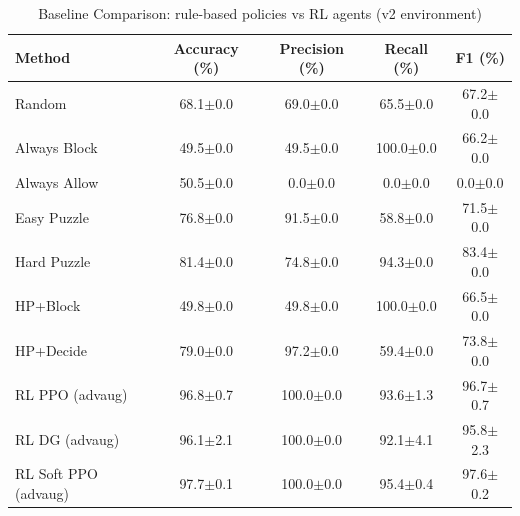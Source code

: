 \begin{table}[h]
\centering
\caption{Baseline Comparison: rule-based policies vs RL agents (v2 environment)}
\label{tab:baselines}
\begin{tabular}{lcccc}
\toprule
Method & Accuracy (\%) & Precision (\%) & Recall (\%) & F1 (\%) \\
\midrule
  Random & 68.1$\pm$0.0 & 69.0$\pm$0.0 & 65.5$\pm$0.0 & 67.2$\pm$0.0 \\
  Always Block & 49.5$\pm$0.0 & 49.5$\pm$0.0 & 100.0$\pm$0.0 & 66.2$\pm$0.0 \\
  Always Allow & 50.5$\pm$0.0 & 0.0$\pm$0.0 & 0.0$\pm$0.0 & 0.0$\pm$0.0 \\
  Easy Puzzle & 76.8$\pm$0.0 & 91.5$\pm$0.0 & 58.8$\pm$0.0 & 71.5$\pm$0.0 \\
  Hard Puzzle & 81.4$\pm$0.0 & 74.8$\pm$0.0 & 94.3$\pm$0.0 & 83.4$\pm$0.0 \\
  HP+Block & 49.8$\pm$0.0 & 49.8$\pm$0.0 & 100.0$\pm$0.0 & 66.5$\pm$0.0 \\
  HP+Decide & 79.0$\pm$0.0 & 97.2$\pm$0.0 & 59.4$\pm$0.0 & 73.8$\pm$0.0 \\
\midrule
  RL PPO (advaug) & 96.8$\pm$0.7 & 100.0$\pm$0.0 & 93.6$\pm$1.3 & 96.7$\pm$0.7 \\
  RL DG (advaug) & 96.1$\pm$2.1 & 100.0$\pm$0.0 & 92.1$\pm$4.1 & 95.8$\pm$2.3 \\
  RL Soft PPO (advaug) & 97.7$\pm$0.1 & 100.0$\pm$0.0 & 95.4$\pm$0.4 & 97.6$\pm$0.2 \\
\bottomrule
\end{tabular}
\end{table}